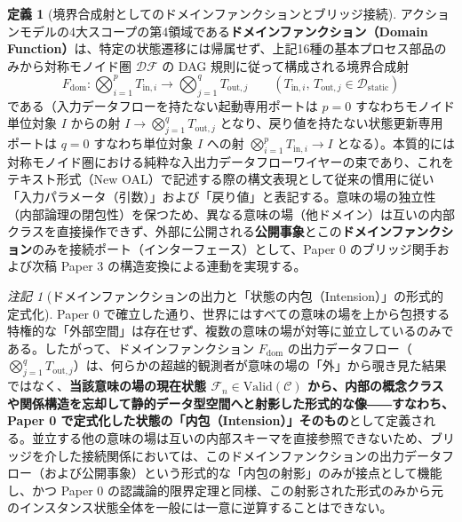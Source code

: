 \documentclass[11pt,a4paper]{ltjsarticle}
\theoremstyle{definition}
\newtheorem{definition}{定義}[section]
\theoremstyle{plain}
\theoremstyle{remark}
\newtheorem{remark}{注記}[section]
\newcommand{\Valid}{\mathrm{Valid}}
\newcommand{\DF}{\mathcal{DF}}
\newcommand{\Dstatic}{\mathcal{D}_{\mathrm{static}}}
\begin{document}
\begin{definition}[境界合成射としてのドメインファンクションとブリッジ接続]\label{def:domain-function}
アクションモデルの4大スコープの第4領域である\textbf{ドメインファンクション（Domain Function）}は、特定の状態遷移には帰属せず、上記16種の基本プロセス部品のみから対称モノイド圏 $\DF$ の DAG 規則に従って構成される境界合成射
\begin{equation}
F_{\mathrm{dom}} : \bigotimes_{i=1}^p T_{\mathrm{in}, i} \longrightarrow \bigotimes_{j=1}^q T_{\mathrm{out}, j} \qquad (T_{\mathrm{in}, i},\, T_{\mathrm{out}, j} \in \Dstatic)
\end{equation}
である（入力データフローを持たない起動専用ポートは $p=0$ すなわちモノイド単位対象 $I$ からの射 $I \to \bigotimes_{j=1}^q T_{\mathrm{out}, j}$ となり、戻り値を持たない状態更新専用ポートは $q=0$ すなわち単位対象 $I$ への射 $\bigotimes_{i=1}^p T_{\mathrm{in}, i} \to I$ となる）。本質的には対称モノイド圏における純粋な入出力データフローワイヤーの束であり、これをテキスト形式（New OAL）で記述する際の構文表現として従来の慣用に従い「入力パラメータ（引数）」および「戻り値」と表記する。意味の場の独立性（内部論理の閉包性）を保つため、異なる意味の場（他ドメイン）は互いの内部クラスを直接操作できず、外部に公開される\textbf{公開事象}とこの\textbf{ドメインファンクション}のみを接続ポート（インターフェース）として、Paper 0 のブリッジ関手および次稿 Paper 3 の構造変換による連動を実現する。
\end{definition}

\begin{remark}[ドメインファンクションの出力と「状態の内包（Intension）」の形式的定式化]\label{rem:dom-intension}
Paper 0 \cite{ota2026paper0} で確立した通り、世界にはすべての意味の場を上から包摂する特権的な「外部空間」は存在せず、複数の意味の場が対等に並立しているのみである。したがって、ドメインファンクション $F_{\mathrm{dom}}$ の出力データフロー（$\bigotimes_{j=1}^q T_{\mathrm{out}, j}$）は、何らかの超越的観測者が意味の場の「外」から覗き見た結果ではなく、\textbf{当該意味の場の現在状態 $\mathcal{F}_n \in \Valid(\mathcal{C})$ から、内部の概念クラスや関係構造を忘却して静的データ型空間へと射影した形式的な像――すなわち、Paper 0 で定式化した状態の「内包（Intension）」そのもの}として定義される。並立する他の意味の場は互いの内部スキーマを直接参照できないため、ブリッジを介した接続関係においては、このドメインファンクションの出力データフロー（および公開事象）という形式的な「内包の射影」のみが接点として機能し、かつ Paper 0 の認識論的限界定理と同様、この射影された形式のみから元のインスタンス状態全体を一般には一意に逆算することはできない。
\end{remark}
\end{document}
